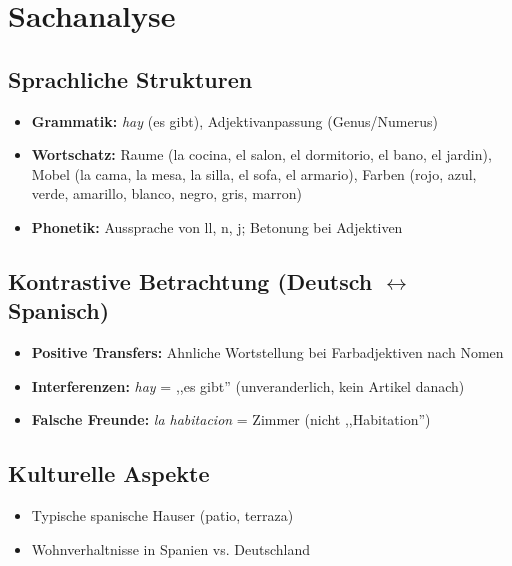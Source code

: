 \documentclass[11pt,a4paper]{article}
\begin{document}
\section{Sachanalyse}

\subsection{Sprachliche Strukturen}
\begin{itemize}
    \item \textbf{Grammatik:} \textit{hay} (es gibt), Adjektivanpassung (Genus/Numerus)
    \item \textbf{Wortschatz:} Raume (la cocina, el salon, el dormitorio, el bano, el jardin), Mobel (la cama, la mesa, la silla, el sofa, el armario), Farben (rojo, azul, verde, amarillo, blanco, negro, gris, marron)
    \item \textbf{Phonetik:} Aussprache von ll, n, j; Betonung bei Adjektiven
\end{itemize}

\subsection{Kontrastive Betrachtung (Deutsch $\leftrightarrow$ Spanisch)}
\begin{itemize}
    \item \textbf{Positive Transfers:} Ahnliche Wortstellung bei Farbadjektiven nach Nomen
    \item \textbf{Interferenzen:} \textit{hay} = ,,es gibt'' (unveranderlich, kein Artikel danach)
    \item \textbf{Falsche Freunde:} \textit{la habitacion} = Zimmer (nicht ,,Habitation'')
\end{itemize}

\subsection{Kulturelle Aspekte}
\begin{itemize}
    \item Typische spanische Hauser (patio, terraza)
    \item Wohnverhaltnisse in Spanien vs. Deutschland
\end{itemize}

\end{document}
